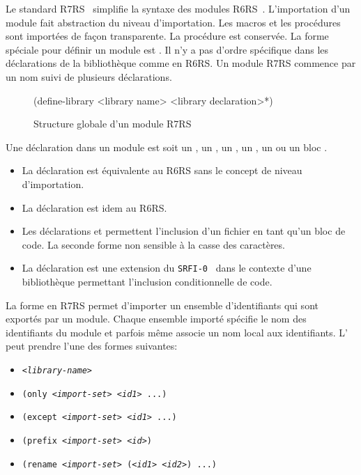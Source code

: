 Le standard R7RS~\cite{Scheme:R7RS} simplifie la syntaxe des modules
R6RS~\cite{Scheme:R6RS}.  L'importation d'un module fait abstraction du niveau
d'importation. Les macros et les procédures sont importées de façon
transparente. La procédure  est conservée. La forme spéciale pour
définir un module est . Il n'y a pas d'ordre spécifique
dans les déclarations de la bibliothèque comme en R6RS. Un module R7RS commence par
un nom suivi de plusieurs déclarations.\\
\begin{figure}[ht]
  \centering
  \begin{mplisting}{0.5}
(define-library <library name>
  <library declaration>*)
\end{mplisting}
  \caption{Structure globale d'un module R7RS}
  \label{fig:syntax->define-library}
\end{figure}

Une déclaration dans un module est soit un , un ,
un , un , un  ou un
bloc .
\begin{itemize}
  \item La déclaration  est équivalente au R6RS sans le concept
    de niveau d'importation.

  \item La déclaration  est idem au R6RS.

  \item Les déclarations  et  permettent
    l'inclusion d'un fichier en tant qu'un bloc de code.  La seconde forme
    non sensible à la casse des caractères.

  \item La déclaration  est une extension du
    \texttt{SRFI-0}~\cite{SRFI-0} dans le contexte d'une bibliothèque
    permettant l'inclusion conditionnelle de code.

\end{itemize}

La forme  en R7RS permet d'importer un ensemble d'identifiants
qui sont exportés par un module. Chaque ensemble importé spécifie le nom des
identifiants du module et parfois même associe un nom local aux identifiants.
L' peut prendre l'une des formes suivantes:
\begin{itemize}
  \label{itm:import-set}
  \item \texttt{\textit{<library-name>}}
  \item \texttt{(only \textit{<import-set>} \textit{<id1>} ...)}
  \item \texttt{(except \textit{<import-set>} \textit{<id1>} ...)}
  \item \texttt{(prefix \textit{<import-set>} \textit{<id>})}
  \item \texttt{(rename \textit{<import-set>} (\textit{<id1>} \textit{<id2>}) ...)}
\end{itemize}


